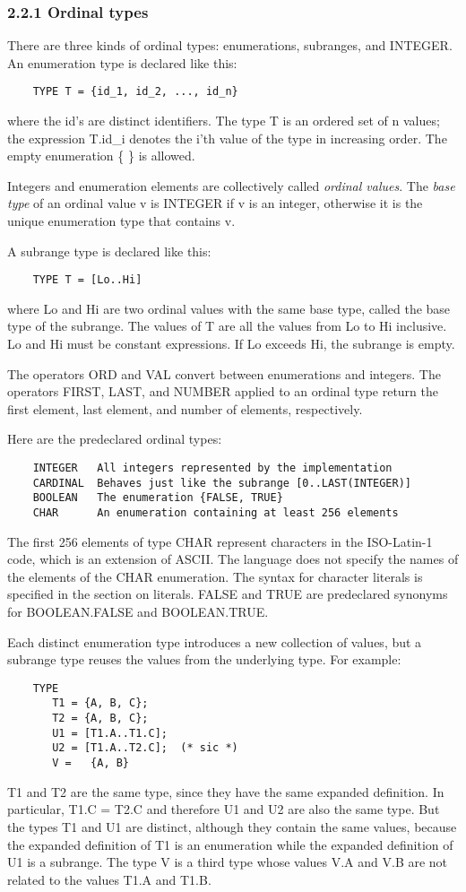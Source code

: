 \documentclass[10pt]{article}
\begin{document}
\subsubsection*{2.2.1 Ordinal types}

There are three kinds of ordinal types: enumerations, subranges, and INTEGER.
An enumeration type is declared like this:
\begin{verbatim}
    TYPE T = {id_1, id_2, ..., id_n}
\end{verbatim}
where the id's are distinct identifiers.  The type T is an ordered set of n
values; the expression T.id\_i denotes the i'th value of the type in
increasing order.  The empty enumeration \{ \} is allowed.

Integers and enumeration elements are collectively called \emph{ordinal
  values}.  The \emph{base type} of an ordinal value v is INTEGER if v is an
integer, otherwise it is the unique enumeration type that contains v.

A subrange type is declared like this:
\begin{verbatim}
    TYPE T = [Lo..Hi]
\end{verbatim}
where Lo and Hi are two ordinal values with the same base type, called the
base type of the subrange.  The values of T are all the values from Lo to Hi
inclusive.  Lo and Hi must be constant expressions.  If Lo exceeds Hi, the
subrange is empty.

The operators ORD and VAL convert between enumerations and integers.  The
operators FIRST, LAST, and NUMBER applied to an ordinal type return the first
element, last element, and number of elements, respectively.

Here are the predeclared ordinal types:
\begin{verbatim}
    INTEGER   All integers represented by the implementation
    CARDINAL  Behaves just like the subrange [0..LAST(INTEGER)]
    BOOLEAN   The enumeration {FALSE, TRUE}
    CHAR      An enumeration containing at least 256 elements
\end{verbatim}
The first 256 elements of type CHAR represent characters in the ISO-Latin-1
code, which is an extension of ASCII.  The language does not specify the names
of the elements of the CHAR enumeration.  The syntax for character literals is
specified in the section on literals.  FALSE and TRUE are predeclared synonyms
for BOOLEAN.FALSE and BOOLEAN.TRUE.

Each distinct enumeration type introduces a new collection of values, but a
subrange type reuses the values from the underlying type.  For example:
\begin{verbatim}
    TYPE
       T1 = {A, B, C};
       T2 = {A, B, C};
       U1 = [T1.A..T1.C];
       U2 = [T1.A..T2.C];  (* sic *)
       V =   {A, B}
\end{verbatim}
T1 and T2 are the same type, since they have the same expanded definition.  In
particular, T1.C = T2.C and therefore U1 and U2 are also the same type.  But
the types T1 and U1 are distinct, although they contain the same values,
because the expanded definition of T1 is an enumeration while the expanded
definition of U1 is a subrange.  The type V is a third type whose values V.A
and V.B are not related to the values T1.A and T1.B.
\end{document}
